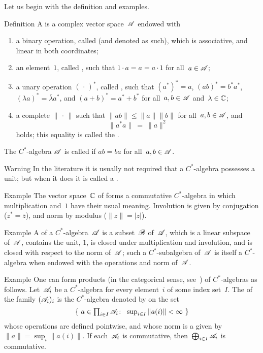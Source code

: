 \documentclass[main]{subfiles}
\begin{document}
Let us begin with the definition
and examples.
\begin{parsec}%
\begin{point}{Definition}%
A 
is a complex vector space~$\mathscr{A}$
endowed with
\begin{enumerate}
\item
a binary operation,
called 
(and denoted as such),
which is associative, and linear in both coordinates;
\item
an element~$1$, called ,
such that $1\cdot a = a = a\cdot 1$
for all~$a\in \mathscr{A}$;
\item
a unary operation $(\,\cdot\,)^*$,
called ,
such that $(a^*)^*=a$,
$(ab)^*=b^*a^*$,
$(\lambda a)^* = \bar\lambda a^*$,
and $(a+b)^* = a^*+b^*$
for all~$a,b\in\mathscr{A}$ and~$\lambda\in \mathbb{C}$;
\item
a complete  $\|\,\cdot\,\|$
such that
$\|ab\|\leq\|a\|\|b\|$
for all~$a,b\in\mathscr{A}$,
and 
\begin{equation*}
\label{eq:Cstar-identity}
\|a^*a\|\ =\ \|a\|^2
\end{equation*}
holds; this equality is called the .
\end{enumerate}
The $C^*$-algebra $\mathscr{A}$ is called 
if $ab=ba$ for all~$a,b\in\mathscr{A}$.
\begin{point}{Warning}%
In the literature it is usually not
required that a $C^*$-algebra
possesses a unit; but when it does it is called
a .
\end{point}
\end{point}
\begin{point}{Example}%
The vector space~$\mathbb{C}$ of 
forms a commutative  $C^*$-algebra
in which
multiplication and~$1$
have their usual meaning.
Involution is given by conjugation ($z^*=\bar{z}$),
and norm by modulus ($\|z\|=|z|$).
\end{point}
\begin{point}{Example}%
A 
of a $C^*$-algebra~$\mathscr{A}$
is a subset~$\mathscr{B}$ of~$\mathscr{A}$,
which is a linear subspace of~$\mathscr{A}$,
contains the unit, $1$, is closed under multiplication
and involution, 
and is closed with respect to the norm of~$\mathscr{A}$;
such a $C^*$-subalgebra of~$\mathscr{A}$
is itself a $C^*$-algebra
when endowed with the operations and norm
of~$\mathscr{A}$.
\end{point}
\begin{point}{Example}%
One can form products (in the categorical sense,
see~) of $C^*$-algebras as follows.
Let~$\mathscr{A}_i$ be a $C^*$-algebra
for every element~$i$ of some index set~$I$.
The 
of the family $(\mathscr{A}_i)_i$
is the $C^*$-algebra
denoted by  on the set
\begin{equation*}
\textstyle
\{\  a\in \prod_{i\in I}\mathscr{A}_i\colon\  \sup_{i \in I} \|a(i)\|< \infty \ \}
\end{equation*}
whose operations are defined pointwise,
and whose norm is a  given by $\|a\|=\sup_{i}\|a(i)\|$.
If each~$\mathscr{A}_i$ is commutative,
then~$\bigoplus_{i\in I}\mathscr{A}_i$
is commutative.


\end{point}
\end{parsec}
\end{document}
